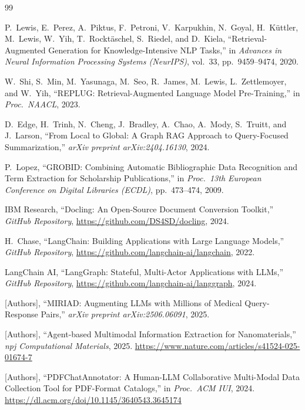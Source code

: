 \documentclass[12pt, a4paper]{article}
\begin{document}

\begin{thebibliography}{99}

P.\ Lewis, E.\ Perez, A.\ Piktus, F.\ Petroni, V.\ Karpukhin,
N.\ Goyal, H.\ K\"{u}ttler, M.\ Lewis, W.\ Yih, T.\ Rockt\"{a}schel,
S.\ Riedel, and D.\ Kiela,
``Retrieval-Augmented Generation for Knowledge-Intensive NLP Tasks,''
in \textit{Advances in Neural Information Processing Systems (NeurIPS)},
vol.~33, pp.~9459--9474, 2020.

W.\ Shi, S.\ Min, M.\ Yasunaga, M.\ Seo, R.\ James, M.\ Lewis,
L.\ Zettlemoyer, and W.\ Yih,
``REPLUG: Retrieval-Augmented Language Model Pre-Training,''
in \textit{Proc.\ NAACL}, 2023.

D.\ Edge, H.\ Trinh, N.\ Cheng, J.\ Bradley, A.\ Chao,
A.\ Mody, S.\ Truitt, and J.\ Larson,
``From Local to Global: A Graph RAG Approach to Query-Focused
Summarization,''
\textit{arXiv preprint arXiv:2404.16130}, 2024.

P.\ Lopez,
``GROBID: Combining Automatic Bibliographic Data Recognition and
Term Extraction for Scholarship Publications,''
in \textit{Proc.\ 13th European Conference on Digital Libraries
(ECDL)}, pp.~473--474, 2009.

IBM Research,
``Docling: An Open-Source Document Conversion Toolkit,''
\textit{GitHub Repository}, \url{https://github.com/DS4SD/docling}, 2024.

H.\ Chase,
``LangChain: Building Applications with Large Language Models,''
\textit{GitHub Repository}, \url{https://github.com/langchain-ai/langchain}, 2022.

LangChain AI,
``LangGraph: Stateful, Multi-Actor Applications with LLMs,''
\textit{GitHub Repository}, \url{https://github.com/langchain-ai/langgraph}, 2024.

[Authors],
``MIRIAD: Augmenting LLMs with Millions of Medical Query-Response Pairs,''
\textit{arXiv preprint arXiv:2506.06091}, 2025.

[Authors],
``Agent-based Multimodal Information Extraction for Nanomaterials,''
\textit{npj Computational Materials}, 2025.
\url{https://www.nature.com/articles/s41524-025-01674-7}

[Authors],
``PDFChatAnnotator: A Human-LLM Collaborative Multi-Modal Data
Collection Tool for PDF-Format Catalogs,''
in \textit{Proc.\ ACM IUI}, 2024.
\url{https://dl.acm.org/doi/10.1145/3640543.3645174}

\end{thebibliography}
\end{document}
